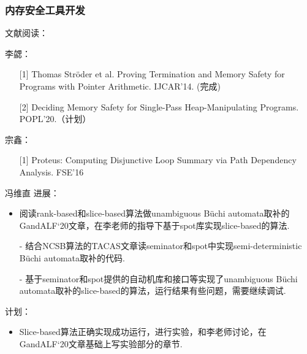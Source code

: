 \documentclass[aspectratio=1610, 13pt]{beamer}
\newcommand{\buchi}{B\"uchi }
\begin{document}
 


\begin{frame}\frametitle{内存安全工具开发}
文献阅读：

李勰：
\begin{itemize}

\item [{[1]}] Thomas Ströder et al. Proving Termination and Memory Safety for Programs with Pointer Arithmetic. IJCAR'14. (完成)


\item [{[2]}] Deciding Memory Safety for Single-Pass Heap-Manipulating Programs. POPL'20.（计划）
\end{itemize}

宗鑫：
\begin{itemize}
\item [{[1]}] Proteus: Computing Disjunctive Loop Summary via Path Dependency Analysis. FSE'16
\end{itemize}

\end{frame}
\begin{frame}{冯维直}
进展：
    \begin{itemize}
        \item 阅读rank-based和slice-based算法做unambiguous \buchi automata取补的GandALF‘20文章，在李老师的指导下基于spot库实现slice-based的算法.
        \item [-] 结合NCSB算法的TACAS文章读seminator和spot中实现semi-deterministic \buchi automata取补的代码.
        \item [-] 基于seminator和spot提供的自动机库和接口等实现了unambiguous \buchi automata取补的slice-based的算法，运行结果有些问题，需要继续调试.
\end{itemize}    
计划：
    
    \begin{itemize}
        \item Slice-based算法正确实现成功运行，进行实验，和李老师讨论，在GandALF‘20文章基础上写实验部分的章节.
\end{itemize}    
\end{frame}
\end{document}
